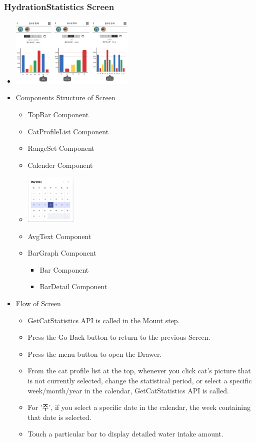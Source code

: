 \documentclass[conference]{IEEEtran}
\begin{document}
\subsubsection{HydrationStatistics Screen}
\begin{itemize}
    \item[] \includegraphics[width=0.47\textwidth]{img/D/16.png}
    \item Components Structure of Screen
    \begin{itemize}
        \item TopBar Component
        \item CatProfileList Component
        \item RangeSet Component
        \item Calender Component
        \item[] \includegraphics[width=0.2\textwidth]{img/D/16-1.png}
        \item AvgText Component
        \item BarGraph Component
        \begin{itemize}
            \item Bar Component
            \item BarDetail Component
        \end{itemize}
    \end{itemize}
    \item Flow of Screen
    \begin{itemize}
        \item GetCatStatistics API is called in the Mount step.
        \item Press the Go Back button to return to the previous Screen.
        \item Press the menu button to open the Drawer.
        \item From the cat profile list at the top, whenever you click cat's picture that is not currently selected, change the statistical period, or select a specific week/month/year in the calendar, GetCatStatistics API is called.
        \item For '주', if you select a specific date in the calendar, the week containing that date is selected.
        \item Touch a particular bar to display detailed water intake amount.
    \end{itemize}
\end{itemize}
\newpage
\end{document}
